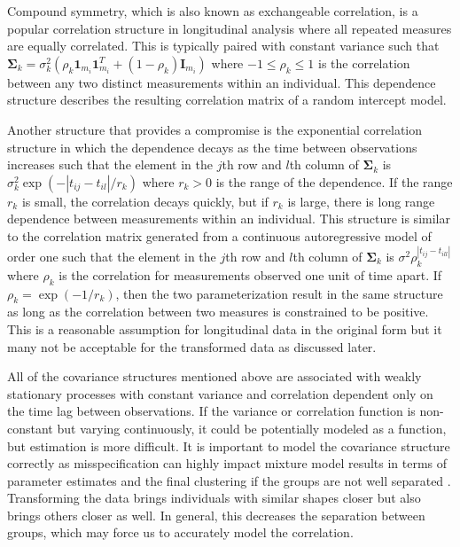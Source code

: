 \documentclass[12pt]{article}
\newcommand{\B}[0]{\mathbf}
\newcommand{\BS}[0]{\boldsymbol}
\begin{document}
Compound symmetry, which is also known as exchangeable correlation, is a popular correlation structure in longitudinal analysis where all repeated measures are equally correlated. This is typically paired with constant variance such that $\B \Sigma_{k} = \sigma_{k}^{2}(\rho_{k}\B1_{m_{i}}\B1_{m_{i}}^{T}+(1-\rho_{k})\B I_{m_{i}})$ where $-1\leq\rho_{k}\leq 1$ is the correlation between any two distinct measurements within an individual. This dependence structure describes the resulting correlation matrix of a random intercept model.

Another structure that provides a compromise is the exponential correlation structure in which the dependence decays as the time between observations increases such that the element in the $j$th row and $l$th column of $\BS\Sigma_{k}$ is $\sigma_{k}^{2}\exp(-| t_{ij}-t_{il}| / r_{k})$ where $r_{k}> 0$ is the range of the dependence. If the range $r_{k}$ is small, the correlation decays quickly, but if $r_{k}$ is large, there is long range dependence between measurements within an individual. This structure is similar to the correlation matrix generated from a continuous autoregressive model of order one such that the element in the $j$th row and $l$th column of $\BS\Sigma_{k}$ is $\sigma^{2}\rho_{k}^{|t_{ij}-t_{ill}|}$ where $\rho_{k}$ is the correlation for measurements observed one unit of time apart. If $\rho_{k} = \exp(-1/r_{k})$, then the two parameterization result in the same structure as long as the correlation between two measures is constrained to be positive. This is a reasonable assumption for longitudinal data in the original form but it many not be acceptable for the transformed data as discussed later.

All of the covariance structures mentioned above are associated with weakly stationary processes with constant variance and correlation dependent only on the time lag between observations. If the variance or correlation function is non-constant but varying continuously, it could be potentially modeled as a function, but estimation is more difficult. It is important to model the covariance structure correctly as misspecification can highly impact mixture model results in terms of parameter estimates and the final clustering if the groups are not well separated \cite{heggeseth2013}. Transforming the data brings individuals with similar shapes closer but also brings others closer as well. In general, this decreases the separation between groups, which may force us to accurately model the correlation. 
\end{document}
